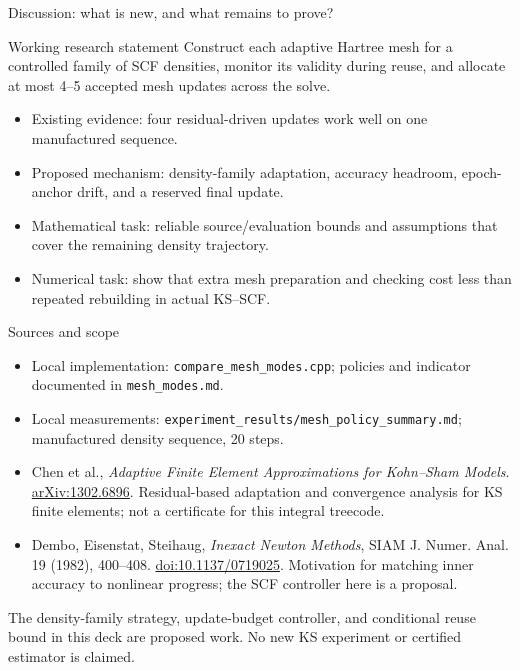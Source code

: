 \documentclass[aspectratio=169,10pt]{beamer}
\begin{document}
\begin{frame}{Discussion: what is new, and what remains to prove?}
\begin{block}{Working research statement}
Construct each adaptive Hartree mesh for a controlled family of SCF densities, monitor its validity during reuse, and allocate at most 4--5 accepted mesh updates across the solve.
\end{block}
\begin{itemize}
\item Existing evidence: four residual-driven updates work well on one manufactured sequence.
\item Proposed mechanism: density-family adaptation, accuracy headroom, epoch-anchor drift, and a reserved final update.
\item Mathematical task: reliable source/evaluation bounds and assumptions that cover the remaining density trajectory.
\item Numerical task: show that extra mesh preparation and checking cost less than repeated rebuilding in actual KS--SCF.
\end{itemize}
\end{frame}

\begin{frame}{Sources and scope}
\footnotesize
\begin{itemize}
\item Local implementation: \texttt{compare\_mesh\_modes.cpp}; policies and indicator documented in \texttt{mesh\_modes.md}.
\item Local measurements: \texttt{experiment\_results/mesh\_policy\_summary.md}; manufactured density sequence, 20 steps.
\item Chen et al., \emph{Adaptive Finite Element Approximations for Kohn--Sham Models}. \href{https://arxiv.org/abs/1302.6896}{arXiv:1302.6896}. Residual-based adaptation and convergence analysis for KS finite elements; not a certificate for this integral treecode.
\item Dembo, Eisenstat, Steihaug, \emph{Inexact Newton Methods}, SIAM J. Numer. Anal. 19 (1982), 400--408. \href{https://doi.org/10.1137/0719025}{doi:10.1137/0719025}. Motivation for matching inner accuracy to nonlinear progress; the SCF controller here is a proposal.
\end{itemize}
\medskip
The density-family strategy, update-budget controller, and conditional reuse bound in this deck are proposed work. No new KS experiment or certified estimator is claimed.
\end{frame}
\end{document}
